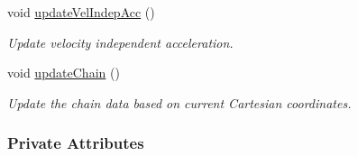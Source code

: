 \begin{DoxyCompactItemize}
void \mbox{\hyperlink{class_a_rchain_a08ddf32fb537ac1556b2e4560abf3b5d}{update\+Vel\+Indep\+Acc}} ()
\begin{DoxyCompactList}\small\item\em Update velocity independent acceleration. \end{DoxyCompactList}\item 
void \mbox{\hyperlink{class_a_rchain_ad576df000b6d9f3948eae2793c6b3c54}{update\+Chain}} ()
\begin{DoxyCompactList}\small\item\em Update the chain data based on current Cartesian coordinates. \end{DoxyCompactList}\end{DoxyCompactItemize}
\subsubsection*{Private Attributes}
